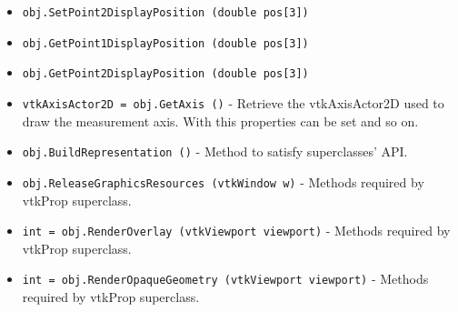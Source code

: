 \begin{itemize}
\item  \verb|obj.SetPoint2DisplayPosition (double pos[3])|

\item  \verb|obj.GetPoint1DisplayPosition (double pos[3])|

\item  \verb|obj.GetPoint2DisplayPosition (double pos[3])|

\item  \verb|vtkAxisActor2D = obj.GetAxis ()| -  Retrieve the vtkAxisActor2D used to draw the measurement axis. With this
 properties can be set and so on.

\item  \verb|obj.BuildRepresentation ()| -  Method to satisfy superclasses' API.

\item  \verb|obj.ReleaseGraphicsResources (vtkWindow w)| -  Methods required by vtkProp superclass.

\item  \verb|int = obj.RenderOverlay (vtkViewport viewport)| -  Methods required by vtkProp superclass.

\item  \verb|int = obj.RenderOpaqueGeometry (vtkViewport viewport)| -  Methods required by vtkProp superclass.

\end{itemize}
